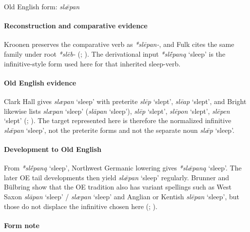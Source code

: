 \documentclass[
  british,
  a4paper,
]{article}
\providecommand{\Recon}[1]{\emph{*#1}}
\begin{document}
Old English form: \emph{slǣpan}

\paragraph{Reconstruction and comparative
evidence}\label{reconstruction-and-comparative-evidence-53}

Kroonen preserves the comparative verb as \emph{*slēpan-}, and Fulk
cites the same family under root \emph{*slēb-}
(; ). The derivational input \Recon{slḗpaną} `sleep' is the
infinitive-style form used here for that inherited sleep-verb.

\paragraph{Old English evidence}\label{old-english-evidence-55}

Clark Hall gives {\emph{slæpan}} `sleep' with preterite \emph{slēp}
`slept', \emph{slēap} `slept', and Bright likewise lists {\emph{slæpan}}
`sleep' ({\emph{slāpan}} `sleep'), \emph{slēp} `slept', \emph{slēpon}
`slept', \emph{slēpen} `slept' (; ). The
target represented here is therefore the normalized infinitive
\emph{slǣpan} `sleep', not the preterite forms and not the separate noun
\emph{slǣp} `sleep'.

\paragraph{Development to Old
English}\label{development-to-old-english-54}

From \Recon{slḗpaną} `sleep', Northwest Germanic lowering gives
\Recon{slǣpaną} `sleep'. The later OE tail developments then yield
{\emph{slǣpan}} `sleep' regularly. Brunner and Bülbring show that the OE
tradition also has variant spellings such as West Saxon {\emph{slāpan}}
`sleep' / {\emph{slæpan}} `sleep' and Anglian or Kentish {\emph{slēpan}}
`sleep', but those do not displace the infinitive chosen here
(;
).

\paragraph{Form note}\label{form-note-16}
\end{document}
